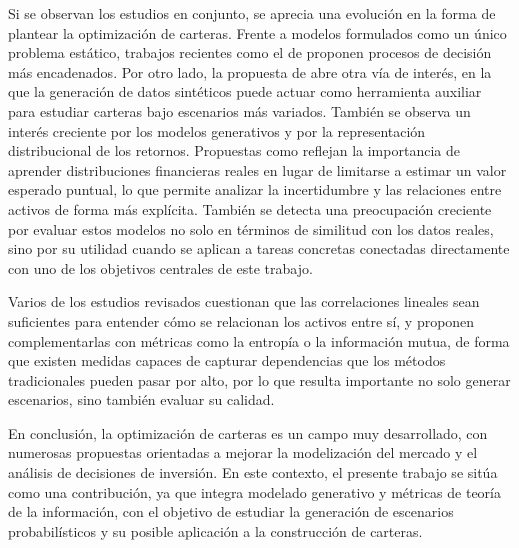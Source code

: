 \documentclass[11pt,a4paper,spanish,oneside]{book}
\numberwithin{equation}{chapter}
\numberwithin{figure}{chapter}
\begin{document}
Si se observan los estudios en conjunto, se aprecia una evolución en la forma de plantear la optimización de carteras. Frente a modelos formulados como un único problema estático, trabajos recientes como el de  proponen procesos de decisión más encadenados. Por otro lado, la propuesta de  abre otra vía de interés, en la que la generación de datos sintéticos puede actuar como herramienta auxiliar para estudiar carteras bajo escenarios más variados. También se observa un interés creciente por los modelos generativos y por la representación distribucional de los retornos. Propuestas como  reflejan la importancia de aprender distribuciones financieras reales en lugar de limitarse a estimar un valor esperado puntual, lo que permite analizar la incertidumbre y las relaciones entre activos de forma más explícita. También se detecta una preocupación creciente por evaluar estos modelos no solo en términos de similitud con los datos reales, sino por su utilidad cuando se aplican a tareas concretas conectadas directamente con uno de los objetivos centrales de este trabajo.

Varios de los estudios revisados cuestionan que las correlaciones lineales sean suficientes para entender cómo se relacionan los activos entre sí, y proponen complementarlas con métricas como la entropía o la información mutua, de forma que existen medidas capaces de capturar dependencias que los métodos tradicionales pueden pasar por alto, por lo que resulta importante no solo generar escenarios, sino también evaluar su calidad.

En conclusión, la optimización de carteras es un campo muy desarrollado, con numerosas propuestas orientadas a mejorar la modelización del mercado y el análisis de decisiones de inversión. En este contexto, el presente trabajo se sitúa como una contribución, ya que integra modelado generativo y métricas de teoría de la información, con el objetivo de estudiar la generación de escenarios probabilísticos y su posible aplicación a la construcción de carteras.
\end{document}
